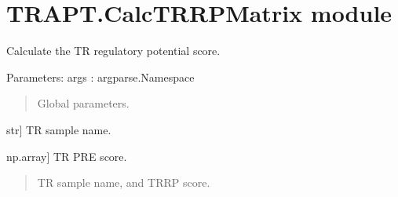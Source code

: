 \documentclass[letterpaper,10pt,english]{sphinxmanual}
\begin{document}
\chapter{TRAPT.CalcTRRPMatrix module}
\label{\detokenize{index:module-TRAPT.CalcTRRPMatrix}}\label{\detokenize{index:trapt-calctrrpmatrix-module}}

\begin{fulllineitems}
\label{\detokenize{index:TRAPT.CalcTRRPMatrix.dhs2gene}}
\pysigstartsignatures
{}
\pysigstopsignatures
\sphinxAtStartPar
Calculate the TR regulatory potential score.

\sphinxAtStartPar
Parameters:
args : argparse.Namespace
\begin{quote}

\sphinxAtStartPar
Global parameters.
\end{quote}
\begin{description}
\sphinxlineitem{sample}{[}str{]}
\sphinxAtStartPar
TR sample name.

\sphinxlineitem{vec}{[}np.array{]}
\sphinxAtStartPar
TR PRE score.

\end{description}
\begin{quote}\begin{description}
\sphinxAtStartPar
TR sample name, and TR\sphinxhyphen{}RP score.

\end{description}\end{quote}

\end{fulllineitems}


\begin{fulllineitems}
\label{\detokenize{index:TRAPT.CalcTRRPMatrix.str2bool}}
\pysigstartsignatures
{}
\pysigstopsignatures
\end{fulllineitems}
\end{document}
